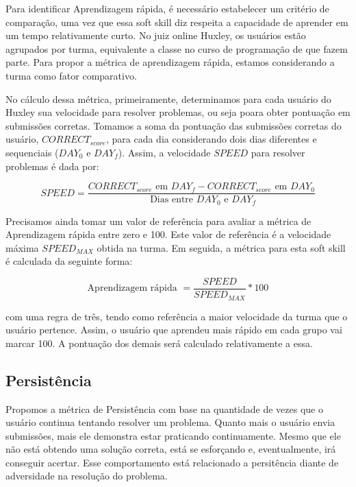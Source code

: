 Para identificar Aprendizagem rápida, é necessário estabelecer um critério de comparação, uma vez que essa soft skill diz respeita a capacidade de aprender em um tempo relativamente curto. No juiz online Huxley, os usuários estão agrupados por turma, equivalente a classe no curso de programação de que fazem parte. Para propor a métrica de aprendizagem rápida, estamos considerando a turma como fator comparativo.

No cálculo dessa métrica, primeiramente, determinamos para cada usuário do Huxley sua velocidade para resolver problemas, ou seja poara obter pontuação em submissões corretas. Tomamos a soma da pontuação das submissões corretas do usuário, $CORRECT_{score}$, para cada dia considerando dois dias diferentes e sequenciais ($DAY_0$ e $DAY_f$). Assim, a velocidade $SPEED$ para resolver problemas é dada por:

\begin{equation} \label{m:velocidade}
SPEED = \frac {CORRECT_{score} \mbox{ em } DAY_f - CORRECT_{score} \mbox{ em } DAY_0 }
              { \mbox{ Dias entre } DAY_0 \mbox{ e } DAY_f }
\end{equation}


Precisamos ainda tomar um valor de referência para avaliar a métrica de Aprendizagem rápida entre zero e 100. Este valor de referência é a velocidade máxima $SPEED_{MAX}$ obtida na turma. Em seguida, a métrica para esta soft skill é calculada da seguinte forma:

\begin{equation} \label{m:aprendizagem}
\mbox{Aprendizagem rápida } = \frac{SPEED}{SPEED_{MAX}} * 100
\end{equation}

com uma regra de três, tendo como referência a maior velocidade da turma que o usuário pertence. Assim, o usuário que aprendeu mais rápido em cada grupo vai marcar 100. A pontuação dos demais será calculado relativamente a essa.

\subsection{Persistência}

Propomos a métrica de Persistência com base na quantidade de vezes que o usuário continua tentando resolver um problema. Quanto mais o usuário envia submissões, mais ele demonstra estar praticando continuamente. Mesmo que ele não está obtendo uma solução correta, está se esforçando e, eventualmente, irá conseguir acertar. Esse comportamento está relacionado a persitência diante de adversidade na resolução do problema.

